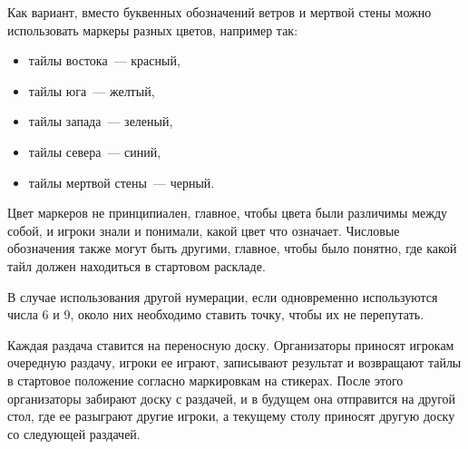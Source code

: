 \begin{additional}
\vspace{0.3cm}

Как вариант, вместо буквенных обозначений ветров и мертвой стены можно использовать маркеры разных цветов, например так:

\begin{itemize}
	\item тайлы востока~--- красный,
	\item тайлы юга~--- желтый,
	\item тайлы запада~--- зеленый,
	\item тайлы севера~--- синий,
	\item тайлы мертвой стены~--- черный.
\end{itemize}

Цвет маркеров не принципиален, главное, чтобы цвета были различимы между собой, и игроки знали и понимали, какой цвет что означает. Числовые обозначения также могут быть другими, главное, чтобы было понятно, где какой тайл должен находиться в стартовом раскладе.

В случае использования другой нумерации, если одновременно используются числа 6 и 9, около них необходимо ставить точку, чтобы их не перепутать.

\vspace{0.3cm}

Каждая раздача ставится на переносную доску. Организаторы приносят игрокам очередную раздачу, игроки ее играют, записывают результат и возвращают тайлы в стартовое положение согласно маркировкам на стикерах. После этого организаторы забирают доску с раздачей, и в будущем она отправится на другой стол, где ее разыграют другие игроки, а текущему столу приносят другую доску со следующей раздачей.

\end{additional}
